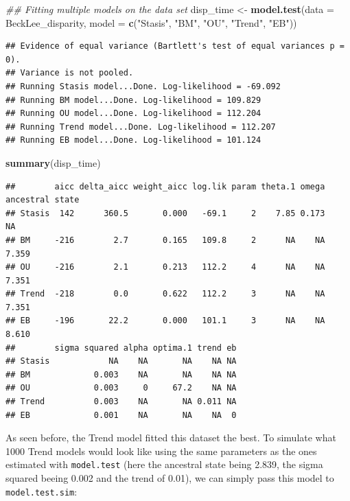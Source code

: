 \documentclass[]{book}
\newenvironment{Shaded}{\begin{snugshade}}{\end{snugshade}}
\newcommand{\CommentTok}[1]{\textcolor[rgb]{0.56,0.35,0.01}{\textit{#1}}}
\newcommand{\DataTypeTok}[1]{\textcolor[rgb]{0.13,0.29,0.53}{#1}}
\newcommand{\KeywordTok}[1]{\textcolor[rgb]{0.13,0.29,0.53}{\textbf{#1}}}
\newcommand{\NormalTok}[1]{#1}
\newcommand{\StringTok}[1]{\textcolor[rgb]{0.31,0.60,0.02}{#1}}
\begin{document}
\begin{Shaded}
\begin{Highlighting}[]
\CommentTok{## Fitting multiple models on the data set}
\NormalTok{disp_time <-}\StringTok{ }\KeywordTok{model.test}\NormalTok{(}\DataTypeTok{data =}\NormalTok{ BeckLee_disparity,}
                    \DataTypeTok{model =} \KeywordTok{c}\NormalTok{(}\StringTok{"Stasis"}\NormalTok{, }\StringTok{"BM"}\NormalTok{, }\StringTok{"OU"}\NormalTok{, }\StringTok{"Trend"}\NormalTok{, }\StringTok{"EB"}\NormalTok{))}
\end{Highlighting}
\end{Shaded}

\begin{verbatim}
## Evidence of equal variance (Bartlett's test of equal variances p = 0).
## Variance is not pooled.
## Running Stasis model...Done. Log-likelihood = -69.092
## Running BM model...Done. Log-likelihood = 109.829
## Running OU model...Done. Log-likelihood = 112.204
## Running Trend model...Done. Log-likelihood = 112.207
## Running EB model...Done. Log-likelihood = 101.124
\end{verbatim}

\begin{Shaded}
\begin{Highlighting}[]
\KeywordTok{summary}\NormalTok{(disp_time)}
\end{Highlighting}
\end{Shaded}

\begin{verbatim}
##        aicc delta_aicc weight_aicc log.lik param theta.1 omega ancestral state
## Stasis  142      360.5       0.000   -69.1     2    7.85 0.173              NA
## BM     -216        2.7       0.165   109.8     2      NA    NA           7.359
## OU     -216        2.1       0.213   112.2     4      NA    NA           7.351
## Trend  -218        0.0       0.622   112.2     3      NA    NA           7.351
## EB     -196       22.2       0.000   101.1     3      NA    NA           8.610
##        sigma squared alpha optima.1 trend eb
## Stasis            NA    NA       NA    NA NA
## BM             0.003    NA       NA    NA NA
## OU             0.003     0     67.2    NA NA
## Trend          0.003    NA       NA 0.011 NA
## EB             0.001    NA       NA    NA  0
\end{verbatim}

As seen before, the Trend model fitted this dataset the best.
To simulate what 1000 Trend models would look like using the same parameters as the ones estimated with \texttt{model.test} (here the ancestral state being 2.839, the sigma squared beeing 0.002 and the trend of 0.01), we can simply pass this model to \texttt{model.test.sim}:
\end{document}
